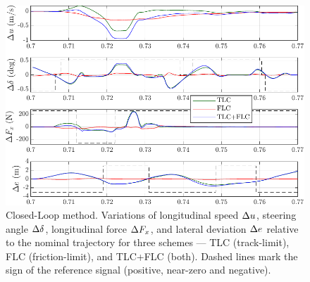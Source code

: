 \begin{figure}[t]
	\centering
	\includegraphics{Fig/cl_telemetries.pdf}
	\caption{Closed-Loop method. Variations of longitudinal speed $\Delta u$, steering angle $\Delta\delta$, longitudinal force $\Delta F_x$, and lateral deviation $\Delta e$ relative to the nominal trajectory for three schemes --- TLC (track-limit), FLC (friction-limit), and TLC+FLC (both).
		Dashed lines mark the sign of the reference signal (positive, near-zero and negative).}
	
	\label{fig:cl_telemetries}
\end{figure}

